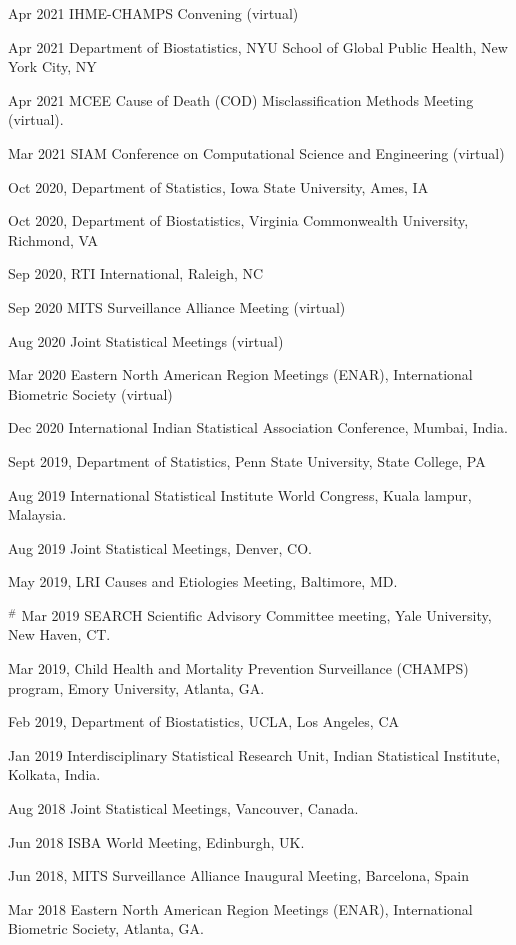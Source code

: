 \documentclass[12pt]{article}
\begin{document}
\item Apr 2021 IHME-CHAMPS Convening (virtual)
\item Apr 2021 Department of Biostatistics, NYU School of Global Public Health, New York City, NY 
\item Apr 2021 MCEE Cause of Death (COD) Misclassification Methods Meeting (virtual).
\item Mar 2021 SIAM Conference on Computational Science and Engineering (virtual)
\item Oct 2020, Department of Statistics, Iowa State University, Ames, IA
\item Oct 2020, Department of Biostatistics, Virginia Commonwealth University, Richmond, VA
\item Sep 2020, RTI International, Raleigh, NC 
\item Sep 2020 MITS Surveillance Alliance Meeting (virtual)
\item Aug 2020 Joint Statistical Meetings (virtual)
\item Mar 2020 Eastern North American Region Meetings (ENAR), International Biometric Society (virtual)
\item Dec 2020 International Indian Statistical Association Conference, Mumbai, India.
\item Sept 2019, Department of Statistics, Penn State University, State College, PA
\item Aug 2019 International Statistical Institute World Congress, Kuala lampur, Malaysia.
\item Aug 2019 Joint Statistical Meetings, Denver, CO.
\item May 2019, LRI Causes and Etiologies Meeting, Baltimore, MD.
\item $^\#$ Mar 2019 SEARCH Scientific Advisory Committee meeting, Yale University, New Haven, CT. 
\item Mar 2019, Child Health and Mortality Prevention Surveillance (CHAMPS) program, Emory University, Atlanta, GA.
\item Feb 2019, Department of Biostatistics, UCLA, Los Angeles, CA
\item Jan 2019 Interdisciplinary Statistical Research Unit, Indian Statistical Institute, Kolkata,
India.
\item Aug 2018 Joint Statistical Meetings, Vancouver, Canada.
\item Jun 2018 ISBA World Meeting, Edinburgh, UK.
\item Jun 2018, MITS Surveillance Alliance Inaugural Meeting, Barcelona, Spain
\item Mar 2018 Eastern North American Region Meetings (ENAR), International Biometric Society, Atlanta, GA.
\end{document}
